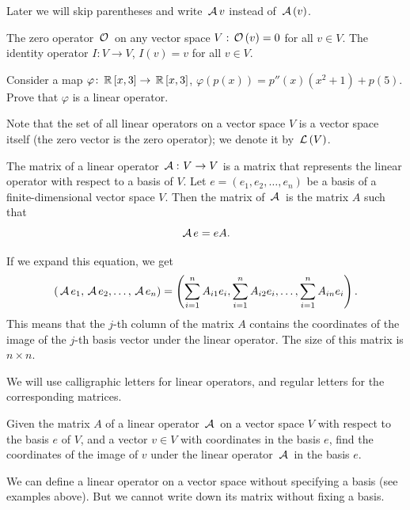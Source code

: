 \begin{remark}
Later we will skip parentheses and write $\,\mathcal{A}\, v$ instead of $\,\mathcal{A}\,(v)$.
\end{remark}

\begin{example}
The zero operator $\,\mathcal{O}\,$ on any vector space $V: \,\mathcal{O}\,(v) = 0$ for all $v \in V$.
The identity operator $I\colon V \to V$, $I(v) = v$ for all $v \in V$.
\end{example}

\begin{exercise}\label{polynomial_linear_operator_example}
    Consider a map $\varphi\colon \,\mathbb{R}\,[x, 3] \to \,\mathbb{R}\,[x, 3]$, $\varphi(p(x)) = p''(x)(x^2 + 1) + p(5)$. Prove that $\varphi$ is a linear operator.
\end{exercise}

Note that the set of all linear operators on a vector space $V$ is a vector space itself (the zero vector is the zero operator); we denote it by $\,\mathcal{L}\,(V)$.

The matrix of a linear operator $\,\mathcal{A}\,\colon V \to V$ is a matrix that represents the linear operator with respect to a basis of $V$. Let $e = (e_1, e_2, \dots, e_n)$ be a basis of a finite-dimensional vector space $V$. Then the matrix of $\,\mathcal{A}\,$ is the matrix $A$ such that
$$
\,\mathcal{A}\, e = e A.
$$

If we expand this equation, we get
$$
(\,\mathcal{A}\, e_1, \,\mathcal{A}\, e_2, \dots, \,\mathcal{A}\, e_n) =\left( \sum_{i=1}^n A_{i1} e_i, \sum_{i=1}^n A_{i2} e_i, \dots, \sum_{i=1}^n A_{in} e_i \right).
$$
This means that the $j$-th column of the matrix $A$ contains the coordinates of the image of the $j$-th basis vector under the linear operator. The size of this matrix is $n \times n$.

\begin{remark}
We will use calligraphic letters for linear operators, and regular letters for the corresponding matrices.
\end{remark}

\begin{exercise}
Given the matrix $A$ of a linear operator $\,\mathcal{A}\,$ on a vector space $V$ with respect to the basis $e$ of $V$, and a vector $v \in V$ with coordinates in the basis $e$, find the coordinates of the image of $v$ under the linear operator $\,\mathcal{A}\,$ in the basis $e$.
\end{exercise}

\begin{remark}
We can define a linear operator on a vector space without specifying a basis (see examples above). But we cannot write down its matrix without fixing a basis.
\end{remark}

